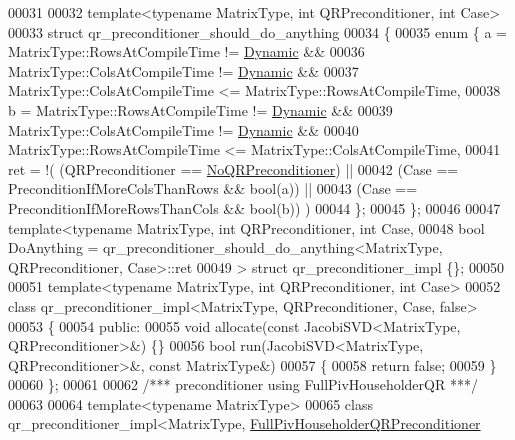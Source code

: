 \begin{DoxyCode}
00031 
00032 \textcolor{keyword}{template}<\textcolor{keyword}{typename} MatrixType, \textcolor{keywordtype}{int} QRPreconditioner, \textcolor{keywordtype}{int} Case>
00033 \textcolor{keyword}{struct }qr\_preconditioner\_should\_do\_anything
00034 \{
00035   \textcolor{keyword}{enum} \{ a = MatrixType::RowsAtCompileTime != \hyperlink{namespace_eigen_ad81fa7195215a0ce30017dfac309f0b2}{Dynamic} &&
00036              MatrixType::ColsAtCompileTime != \hyperlink{namespace_eigen_ad81fa7195215a0ce30017dfac309f0b2}{Dynamic} &&
00037              MatrixType::ColsAtCompileTime <= MatrixType::RowsAtCompileTime,
00038          b = MatrixType::RowsAtCompileTime != \hyperlink{namespace_eigen_ad81fa7195215a0ce30017dfac309f0b2}{Dynamic} &&
00039              MatrixType::ColsAtCompileTime != \hyperlink{namespace_eigen_ad81fa7195215a0ce30017dfac309f0b2}{Dynamic} &&
00040              MatrixType::RowsAtCompileTime <= MatrixType::ColsAtCompileTime,
00041          ret = !( (QRPreconditioner == \hyperlink{group__enums_gga46eba0d5c621f590b8cf1b53af31d56ea4d4b44de7ac7f4e623309be035d287d0}{NoQRPreconditioner}) ||
00042                   (Case == PreconditionIfMoreColsThanRows && \textcolor{keywordtype}{bool}(a)) ||
00043                   (Case == PreconditionIfMoreRowsThanCols && \textcolor{keywordtype}{bool}(b)) )
00044   \};
00045 \};
00046 
00047 \textcolor{keyword}{template}<\textcolor{keyword}{typename} MatrixType, \textcolor{keywordtype}{int} QRPreconditioner, \textcolor{keywordtype}{int} Case,
00048          \textcolor{keywordtype}{bool} DoAnything = qr\_preconditioner\_should\_do\_anything<MatrixType, QRPreconditioner, Case>::ret
00049 > \textcolor{keyword}{struct }qr\_preconditioner\_impl \{\};
00050 
00051 \textcolor{keyword}{template}<\textcolor{keyword}{typename} MatrixType, \textcolor{keywordtype}{int} QRPreconditioner, \textcolor{keywordtype}{int} Case>
00052 \textcolor{keyword}{class }qr\_preconditioner\_impl<MatrixType, QRPreconditioner, Case, false>
00053 \{
00054 \textcolor{keyword}{public}:
00055   \textcolor{keywordtype}{void} allocate(\textcolor{keyword}{const} JacobiSVD<MatrixType, QRPreconditioner>&) \{\}
00056   \textcolor{keywordtype}{bool} run(JacobiSVD<MatrixType, QRPreconditioner>&, \textcolor{keyword}{const} MatrixType&)
00057   \{
00058     \textcolor{keywordflow}{return} \textcolor{keyword}{false};
00059   \}
00060 \};
00061 
00062 \textcolor{comment}{/*** preconditioner using FullPivHouseholderQR ***/}
00063 
00064 \textcolor{keyword}{template}<\textcolor{keyword}{typename} MatrixType>
00065 \textcolor{keyword}{class }qr\_preconditioner\_impl<MatrixType, \hyperlink{group__enums_gga46eba0d5c621f590b8cf1b53af31d56ea566c44ba828dea7f5d2fb174d799d5d2}{FullPivHouseholderQRPreconditioner}

\end{DoxyCode}
